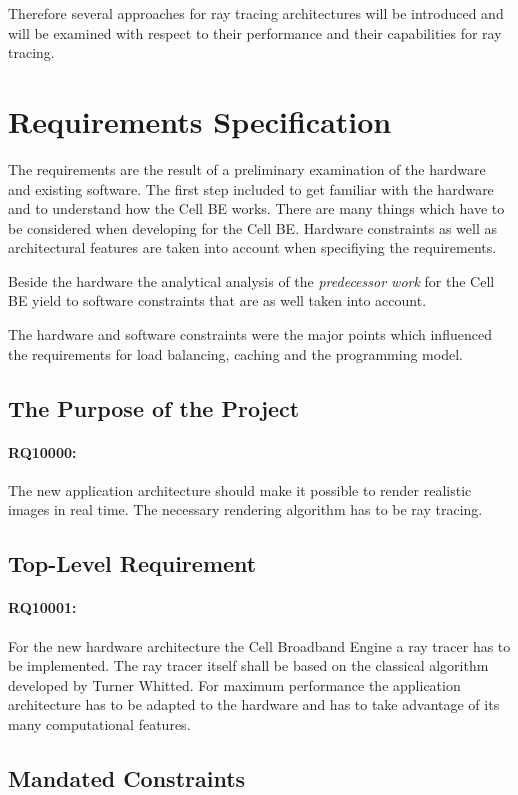 \documentclass[DIV10, abstracton, openright, footsepline, headsepline, twoside, 9pt,
bigheadings]{scrreprt}
\begin{document}
Therefore several approaches for ray tracing architectures will be introduced
and will be examined with respect to their performance and their capabilities
for ray tracing.

\section{Requirements Specification}
The requirements are the result of a preliminary examination of the hardware
and existing software. The first step included to get familiar with the
hardware and to understand how the Cell BE works. There are many things
which have to be considered when developing for the Cell BE. Hardware constraints
as well as architectural features are taken into account when specifiying the
requirements.

Beside the hardware the analytical analysis of the \textit{predecessor work} for the Cell BE yield to software constraints that are as well taken into account.

The hardware and software constraints were the major points which influenced the
 requirements for load balancing, caching and the programming model.


\subsection{The Purpose of the Project}
\paragraph{RQ10000:} The new application architecture should make it possible to
render realistic images in real time. The necessary rendering algorithm has to be ray tracing.

\subsection{Top-Level Requirement}
\paragraph{RQ10001:} For the new hardware architecture the Cell Broadband Engine a
ray tracer has to be implemented. The ray tracer itself shall be based on the
classical algorithm developed by Turner Whitted. For maximum performance the
application architecture has to be adapted to the hardware and has to take
advantage of its many computational features.

\subsection{Mandated Constraints}
\end{document}
